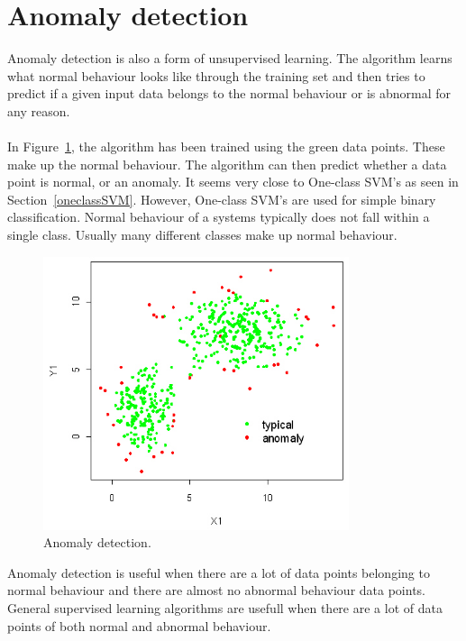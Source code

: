 \section{Anomaly detection}
Anomaly detection is also a form of unsupervised learning. The algorithm learns what normal behaviour looks like through the training set and then tries to predict if a given input data belongs to the normal behaviour or is abnormal for any reason. \\\\
In Figure~\ref{fig:anomalydetection}, the algorithm has been trained using the green data points. These make up the normal behaviour. The algorithm can then predict whether a data point is normal, or an anomaly. It seems very close to One-class SVM's as seen in Section~\ref{oneclassSVM}. However, One-class SVM's are used for simple binary classification. Normal behaviour of a systems typically does not fall within a single class. Usually many different classes make up normal behaviour. 
\begin{figure}[H]
\centering
\includegraphics[width=0.8\textwidth]{Figures/anomaly}
\decoRule
\caption[Anomaly detection]{Anomaly detection. \cite{anomaly-fig}}
\label{fig:anomalydetection}
\end{figure}

\noindent Anomaly detection is useful when there are a lot of data points belonging to normal behaviour and there are almost no abnormal behaviour data points. General supervised learning algorithms are usefull when there are a lot of data points of both normal and abnormal behaviour. \cite{anomalyCoursera}

